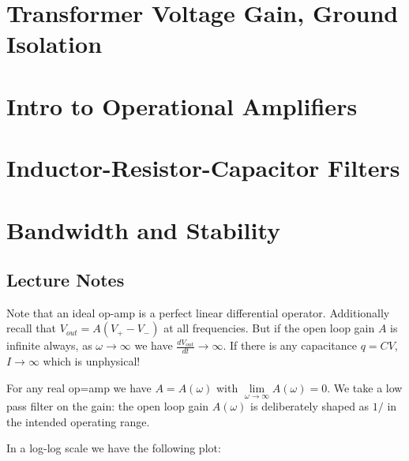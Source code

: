 \chapter{Transformer Voltage Gain, Ground Isolation}

\chapter{Intro to Operational Amplifiers}

\chapter{Inductor-Resistor-Capacitor Filters}


\chapter{Bandwidth and Stability}

\section{Lecture Notes}

Note that an ideal op-amp is a perfect linear differential operator. Additionally recall that $V_{out} = A(V_+-V_-)$ at all frequencies. But if the open loop gain $A$ is infinite always, as $\omega\rightarrow \infty$ we have $\frac{dV_{out}}{dt}\rightarrow \infty$. If there is any capacitance $q = CV$, $I\rightarrow \infty$ which is unphysical!

For any real op=amp we have $A = A(\omega)$ with $\lim\limits_{\omega\rightarrow \infty}A(\omega) = 0$. We take a low pass filter on the gain: the open loop gain $A(\omega)$ is deliberately shaped as $1/$ in the intended operating range.

In a log-log scale we have the following plot:

